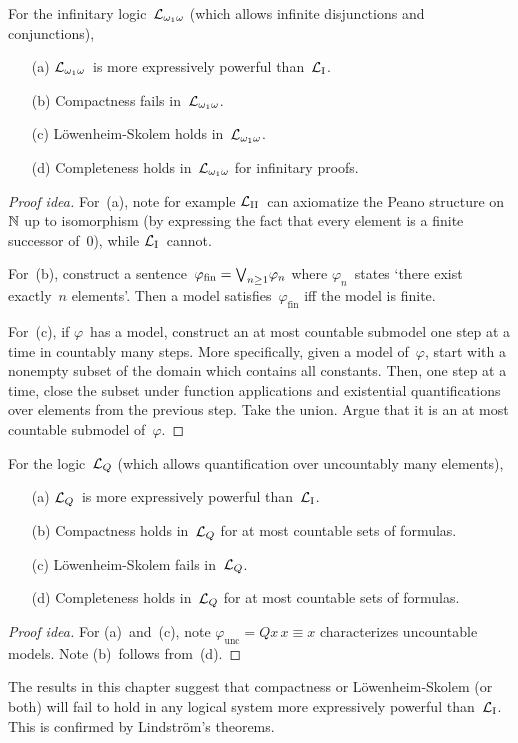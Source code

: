 \begin{thm}[\(\Lo\)]
For the infinitary logic~\(\Lo\) (which allows infinite disjunctions and conjunctions),
\begin{enumerate}[itemsep=0pt]
\item[(a)] \(\Lo\)~is more expressively powerful than~\(\mathcal{L}_{\mathrm{I}}\).
\item[(b)] Compactness fails in~\(\Lo\).
\item[(c)] L\"owenheim-Skolem holds in~\(\Lo\).
\item[(d)] Completeness holds in~\(\Lo\) for infinitary proofs.
\end{enumerate}
\end{thm}
\begin{proof}[Proof idea]
For~(a), note for example \(\mathcal{L}_{\mathrm{II}}\)~can axiomatize the Peano structure on~\(\mathbb{N}\) up to isomorphism (by expressing the fact that every element is a finite successor of~\(0\)), while \(\mathcal{L}_{\mathrm{I}}\)~cannot.

For~(b), construct a sentence~\(\varphi_{\mathrm{fin}}=\textstyle{\bigvee}_{n\ge1}\varphi_n\) where \(\varphi_n\)~states `there exist exactly~\(n\) elements'. Then a model satisfies~\(\varphi_{\mathrm{fin}}\) iff the model is finite.

For~(c), if \(\varphi\)~has a model, construct an at most countable submodel one step at a time in countably many steps. More specifically, given a model of~\(\varphi\), start with a nonempty subset of the domain which contains all constants. Then, one step at a time, close the subset under function applications and existential quantifications over elements from the previous step. Take the union. Argue that it is an at most countable submodel of~\(\varphi\).
\end{proof}

\begin{thm}[\(\Lq\)]
For the logic~\(\Lq\) (which allows quantification over uncountably many elements),
\begin{enumerate}[itemsep=0pt]
\item[(a)] \(\Lq\)~is more expressively powerful than~\(\mathcal{L}_{\mathrm{I}}\).
\item[(b)] Compactness holds in~\(\Lq\) for at most countable sets of formulas.
\item[(c)] L\"owenheim-Skolem fails in~\(\Lq\).
\item[(d)] Completeness holds in~\(\Lq\) for at most countable sets of formulas.
\end{enumerate}
\end{thm}
\begin{proof}[Proof idea]
For (a)~and~(c), note \(\varphi_{\mathrm{unc}}=Qx\,x\equiv x\) characterizes uncountable models. Note (b)~follows from~(d).
\end{proof}

\begin{rmk}
The results in this chapter suggest that compactness or L\"owenheim-Skolem (or both) will fail to hold in any logical system more expressively powerful than~\(\mathcal{L}_{\mathrm{I}}\). This is confirmed by Lindstr\"om's theorems.
\end{rmk}
